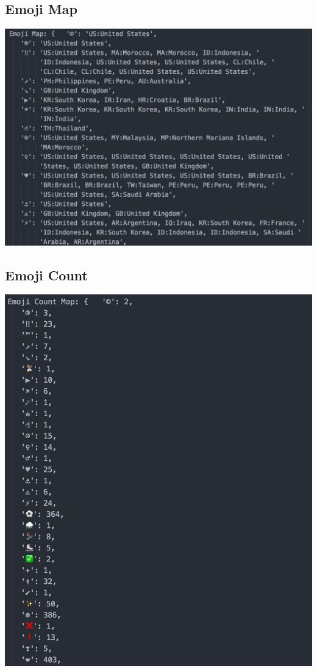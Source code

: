 \documentclass[a4paper,12pt]{article}
\begin{document}
\subsection{Emoji Map}
\includegraphics[scale=0.8]{datamap2.png}
\pagebreak
\subsection{Emoji Count}
\includegraphics[scale=1.0]{datamap3.png}
\end{document}
